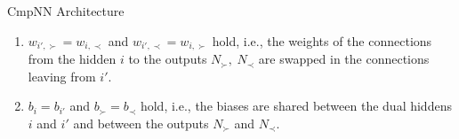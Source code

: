 \documentclass[8pt]{beamer}
\newcommand{\Ytri}{$\triangleright$ }
\renewcommand{\|}[1][.3em]{\hspace{#1}|\hspace{#1}}
\renewcommand{\,}[1][.3em]{,\hspace{#1}}
\newlength{\wideitemsep}
\let\olditem\item
\renewcommand{\item}{\setlength{\itemsep}{\wideitemsep}\olditem}
\newcommand{\subitem}{\item[\Ytri]}
\renewcommand{\,}{,\hspace{3pt}}
\renewcommand{\|}{\hspace{3pt}|\hspace{3pt}}
\newcommand{\outOne}{N_{\succ}}
\newcommand{\outTwo}{N_{\prec}}
\newcommand{\outOneXY}{\outOne([x,y])}
\newcommand{\outTwoXY}{\outTwo([x,y])}
\newcommand{\xy}{x \succ y}
\newcommand{\yx}{y \succ x}
\begin{document}
\begin{frame}{CmpNN Architecture}
\begin{itemize}
{\begin{enumerate}
    \item $w_{i',\succ} = w_{i,\prec}$ and $w_{i',\prec} = w_{i,\succ}$ hold, i.e., the weights of the connections from the hidden $i$ to the outputs $N_\succ\, N_\prec$ are swapped in the connections leaving from $i'$.
    \item $b_i = b_{i'}$ and $b_\succ = b_\prec$  hold, i.e., the biases are shared between the dual hiddens $i$ and $i'$ and between the outputs $N_\succ$ and $N_\prec$.
    \end{enumerate}
    }
    \end{itemize}
\end{frame}
\end{document}
